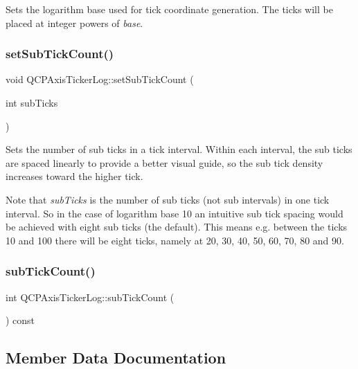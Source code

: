 Sets the logarithm base used for tick coordinate generation. The ticks will be placed at integer powers of {\itshape base}. \mbox{\label{class_q_c_p_axis_ticker_log_ad51989c798c0cfd50936d77aac57c56a}} 
\subsubsection{\texorpdfstring{setSubTickCount()}{setSubTickCount()}}
{\footnotesize\ttfamily void Q\+C\+P\+Axis\+Ticker\+Log\+::set\+Sub\+Tick\+Count (\begin{DoxyParamCaption}\item[{int}]{sub\+Ticks }\end{DoxyParamCaption})}

Sets the number of sub ticks in a tick interval. Within each interval, the sub ticks are spaced linearly to provide a better visual guide, so the sub tick density increases toward the higher tick.

Note that {\itshape sub\+Ticks} is the number of sub ticks (not sub intervals) in one tick interval. So in the case of logarithm base 10 an intuitive sub tick spacing would be achieved with eight sub ticks (the default). This means e.\+g. between the ticks 10 and 100 there will be eight ticks, namely at 20, 30, 40, 50, 60, 70, 80 and 90. \mbox{\label{class_q_c_p_axis_ticker_log_aebe43661977364fc1fd220fa1ae36a10}} 
\subsubsection{\texorpdfstring{subTickCount()}{subTickCount()}}
{\footnotesize\ttfamily int Q\+C\+P\+Axis\+Ticker\+Log\+::sub\+Tick\+Count (\begin{DoxyParamCaption}{ }\end{DoxyParamCaption}) const\hspace{0.3cm}{\ttfamily [inline]}}



\subsection{Member Data Documentation}
\mbox{\label{class_q_c_p_axis_ticker_log_a4108bcc1cd68dcec54dc75667440d328}} 
